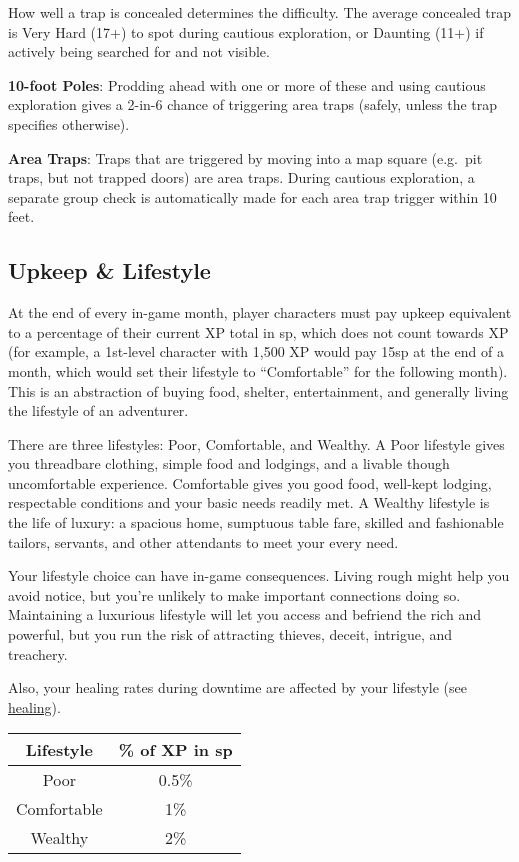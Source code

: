 \documentclass{article}
\begin{document}
\begin{multicols}{2}
How well a trap is concealed determines the difficulty. The average
concealed trap is Very Hard (17+) to spot during cautious exploration,
or Daunting (11+) if actively being searched for and not visible.

\textbf{10-foot Poles}: Prodding ahead with one or more of these and
using cautious exploration gives a 2-in-6 chance of triggering area
traps (safely, unless the trap specifies otherwise).

\textbf{Area Traps}: Traps that are triggered by moving into a map
square (e.g.~pit traps, but not trapped doors) are area traps. During
cautious exploration, a separate group check is automatically made for
each area trap trigger within 10 feet.

\subsection{Upkeep \& Lifestyle}\label{upkeep-lifestyle}

At the end of every in-game month, player characters must pay upkeep
equivalent to a percentage of their current XP total in sp, which does
not count towards XP (for example, a 1st-level character with 1,500 XP
would pay 15sp at the end of a month, which would set their lifestyle to
``Comfortable'' for the following month). This is an abstraction of
buying food, shelter, entertainment, and generally living the lifestyle
of an adventurer.

There are three lifestyles: Poor, Comfortable, and Wealthy. A Poor
lifestyle gives you threadbare clothing, simple food and lodgings, and a
livable though uncomfortable experience. Comfortable gives you good
food, well-kept lodging, respectable conditions and your basic needs
readily met. A Wealthy lifestyle is the life of luxury: a spacious home,
sumptuous table fare, skilled and fashionable tailors, servants, and
other attendants to meet your every need.

Your lifestyle choice can have in-game consequences. Living rough might
help you avoid notice, but you're unlikely to make important connections
doing so. Maintaining a luxurious lifestyle will let you access and
befriend the rich and powerful, but you run the risk of attracting
thieves, deceit, intrigue, and treachery.

Also, your healing rates during downtime are affected by your lifestyle
(see \hyperref[healing]{healing}).

\begin{longtable}[]{@{}cc@{}}
\toprule\noalign{}
Lifestyle & \% of XP in sp \\
\midrule\noalign{}
\endhead
\bottomrule\noalign{}
\endlastfoot
Poor & 0.5\% \\
Comfortable & 1\% \\
Wealthy & 2\% \\
\end{longtable}


\end{multicols}
\end{document}
